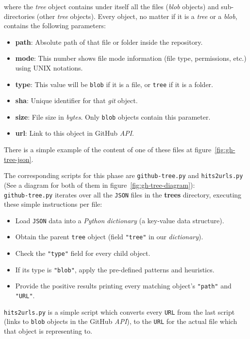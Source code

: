 \documentclass[a4paper, 12pt]{book}
\begin{document}
where the \textit{tree} object contains under itself all the files (\textit{blob} objects) and sub-directories
(other \textit{tree} objects). Every object, no matter if it is a \textit{tree} or a \textit{blob}, contains the following parameters:
\begin{itemize}
  \item \textbf{path}: Absolute path of that file or folder inside the repository.
  \item \textbf{mode}: This number shows file mode information (file type, permissions, etc.) using UNIX notations.
  \item \textbf{type}: This value will be \texttt{blob} if it is a file, or \texttt{tree} if it is a folder.
  \item \textbf{sha}: Unique identifier for that \emph{git} object.
  \item \textbf{size}: File size in \textit{bytes}. Only \texttt{blob} objects contain this parameter.
  \item \textbf{url}: Link to this object in GitHub \textit{API}.
\end{itemize}
There is a simple example of the content of one of these files at figure~\ref{fig:gh-tree-json}.\par
The corresponding scripts for this phase are \texttt{github-tree.py} and \texttt{hits2urls.py}
(See a diagram for both of them in figure~\ref{fig:gh-tree-diagram}):\\
\texttt{github-tree.py} iterates over all the \texttt{JSON} files in the \textbf{trees} directory,
executing these simple instructions per file:
\begin{itemize}
  \item Load \texttt{JSON} data into a \emph{Python} \textit{dictionary} (a key-value data structure).
  \item Obtain the parent \texttt{tree} object (field \texttt{"tree"} in our \textit{dictionary}).
  \item Check the \texttt{"type"} field for every child object.
  \item If its type is \texttt{"blob"}, apply the pre-defined patterns and heuristics.
  \item Provide the positive results printing every matching object's \texttt{"path"} and \texttt{"URL"}.
\end{itemize}
\texttt{hits2urls.py} is a simple script which converts every \texttt{URL} from the last script (links to \texttt{blob} objects
in the GitHub \textit{API}), to the \texttt{URL} for the actual file which that object is representing to.
\end{document}
